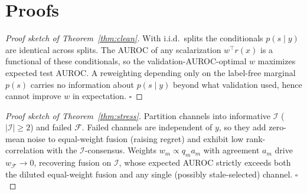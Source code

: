 \documentclass[11pt]{article}
\begin{document}
\section{Proofs}\label{sec:proofs}
\begin{proof}[Proof sketch of Theorem~\ref{thm:clean}]
With i.i.d.\ splits the conditionals $p(s\mid y)$ are identical across splits. The
AUROC of any scalarization $w^\top r(x)$ is a functional of these conditionals, so the
validation-AUROC-optimal $w$ maximizes expected test AUROC. A reweighting depending
only on the label-free marginal $p(s)$ carries no information about $p(s\mid y)$ beyond
what validation used, hence cannot improve $w$ in expectation. $\square$
\end{proof}
\begin{proof}[Proof sketch of Theorem~\ref{thm:stress}]
Partition channels into informative $\mathcal{I}$ ($|\mathcal{I}|\ge2$) and failed
$\mathcal{F}$. Failed channels are independent of $y$, so they add zero-mean noise to
equal-weight fusion (raising regret) and exhibit low rank-correlation with the
$\mathcal{I}$-consensus. Weights $w_m\propto q_m a_m$ with agreement $a_m$ drive
$w_{\mathcal F}\to0$, recovering fusion on $\mathcal I$, whose expected AUROC strictly
exceeds both the diluted equal-weight fusion and any single (possibly stale-selected)
channel. $\square$
\end{proof}
\end{document}
